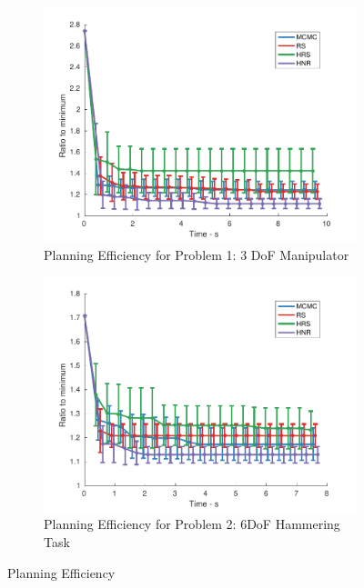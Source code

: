 \documentclass[letterpaper, 10 pt, conference]{ieeeconf}  %
\begin{document}
\begin{figure}[t!]
	\centering
	\begin{subfigure}[b]{0.5\textwidth}
		\includegraphics[width=\linewidth]{fig/planning_efficiency/3dof_general}
		\caption{\captionstyle Planning Efficiency for Problem 1: 3 DoF Manipulator}
		\label{fig:planning_efficiency:3dof:general}
	\end{subfigure}	
	\begin{subfigure}[b]{0.5\textwidth}
		\includegraphics[width=\linewidth]{fig/planning_efficiency/6dof_hammering}
		\caption{Planning Efficiency for Problem 2: 6DoF Hammering Task}
		\label{\captionstyle An example of a 6DOF 3D snake.}
	\end{subfigure}
	\caption{Planning Efficiency}
	\label{fig:planning_efficiency}
\end{figure} 
\end{document}
